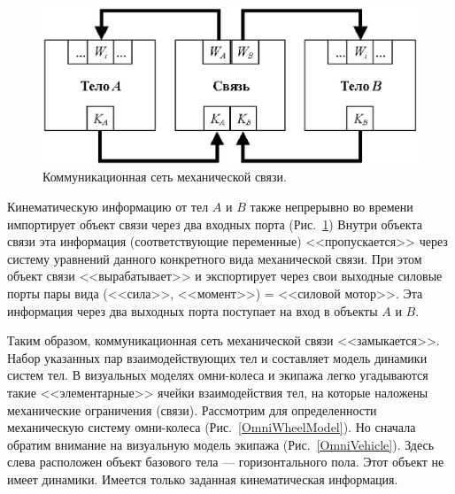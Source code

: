 \begin{figure}[htb]
\centering\includegraphics[width=14cm]{content/parts/3_friction/nd/Fig_2_1.eps}
\caption{Коммуникационная сеть механической связи.}
\label{ConstraintScheme}
\end{figure}

Кинематическую информацию от тел $A$ и $B$ также непрерывно во времени 
импортирует объект связи через два входных порта (Рис.~\ref{ConstraintScheme})
Внутри объекта связи эта информация (соответствующие переменные) 
<<пропускается>> через систему уравнений данного конкретного вида механической
связи. При этом объект связи <<вырабатывает>> и экспортирует через свои 
выходные силовые порты пары вида (<<сила>>, <<момент>>) = <<силовой мотор>>. 
Эта информация через два выходных порта поступает на вход в объекты $A$ и $B$.

Таким образом, коммуникационная сеть механической связи <<замыкается>>. Набор 
указанных пар взаимодействующих тел и составляет модель динамики систем тел. В
визуальных моделях омни-колеса и экипажа легко угадываются такие 
<<элементарные>> ячейки взаимодействия тел, на которые наложены механические 
ограничения (связи). Рассмотрим для определенности механическую систему 
омни-колеса (Рис.~\ref{OmniWheelModel}). Но сначала обратим внимание на 
визуальную модель экипажа (Рис.~\ref{OmniVehicle}). Здесь слева расположен 
объект базового тела --- горизонтального пола. Этот объект не имеет динамики.
Имеется только заданная кинематическая информация.

